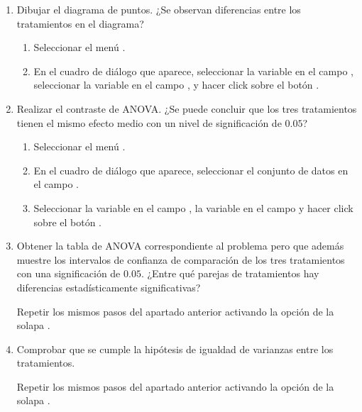 \begin {enumerate}[leftmargin=*]
\begin{enumerate}
\item Dibujar el diagrama de puntos. ¿Se observan diferencias entre los tratamientos en el diagrama?
\begin{indicacion}
\begin{enumerate}
\item Seleccionar el menú .
\item En el cuadro de diálogo que aparece, seleccionar la variable  en el campo , seleccionar la variable  en el campo , y hacer click sobre el botón
.
\end{enumerate}
\end{indicacion}

\item Realizar el contraste de ANOVA. 
¿Se puede concluir que los tres tratamientos tienen el mismo efecto medio con un nivel de significación de $0.05$?
\begin{indicacion}
\begin{enumerate}
\item Seleccionar el menú .
\item En el cuadro de diálogo que aparece, seleccionar el conjunto de datos  en el campo .
\item Seleccionar la variable  en el campo , la variable
 en el campo  y hacer click sobre el botón .
\end{enumerate}
\end{indicacion}

\item Obtener la tabla de ANOVA correspondiente al problema pero que además muestre los intervalos de confianza de
comparación de los tres tratamientos con una significación de $0.05$.
¿Entre qué parejas de tratamientos hay diferencias estadísticamente significativas?
\begin{indicacion} 
Repetir los mismos pasos del apartado anterior activando la opción  de la solapa .
\end{indicacion}

\item Comprobar que se cumple la hipótesis de igualdad de varianzas entre los tratamientos.
\begin{indicacion} 
Repetir los mismos pasos del apartado anterior activando la opción  de la solapa .
\end{indicacion}


\end{enumerate}
\end{enumerate}
